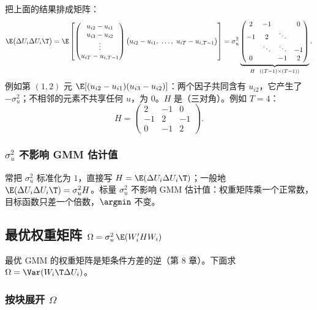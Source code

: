 把上面的结果排成矩阵：
\begin{equation}\label{eq:U12b-H}
\E\big(\Delta U_i\Delta U_i\T\big)
=\E\left[\begin{pmatrix}u_{i2}-u_{i1}\\ u_{i3}-u_{i2}\\ \vdots\\ u_{iT}-u_{i,T-1}\end{pmatrix}
\big(u_{i2}-u_{i1},\ \dots,\ u_{iT}-u_{i,T-1}\big)\right]
=\sigma_u^2\underbrace{\begin{pmatrix}2 & -1 & & 0\\ -1 & 2 & \ddots & \\ & \ddots & \ddots & -1\\ 0 & & -1 & 2\end{pmatrix}}_{H\ \ ((T-1)\times(T-1))}.
\end{equation}
例如第 $(1,2)$ 元 $\E[(u_{i2}-u_{i1})(u_{i3}-u_{i2})]$：两个因子共同含有 $u_{i2}$，它产生了 $-\sigma_u^2$；不相邻的元素不共享任何 $u$，为 $0$。$H$ 是（三对角）。例如 $T=4$：
\[
H=\begin{pmatrix}2 & -1 & 0\\ -1 & 2 & -1\\ 0 & -1 & 2\end{pmatrix}.
\]

\subsubsection{\texorpdfstring{$\sigma_u^2$}{sigma\_u\^{}2} 不影响 GMM 估计值}

常把 $\sigma_u^2$ 标准化为 $1$，直接写 $H=\E(\Delta U_i\Delta U_i\T)$；一般地 $\E(\Delta U_i\Delta U_i\T)=\sigma_u^2H$。标量 $\sigma_u^2$ 不影响 GMM 估计值：权重矩阵乘一个正常数，目标函数只差一个倍数，$\argmin$ 不变。

\subsection{最优权重矩阵 \texorpdfstring{$\Omega=\sigma_u^2\,\E(W_i'HW_i)$}{Omega = sigma\^{}2 E(W'HW)}}

最优 GMM 的权重矩阵是矩条件方差的逆（第 8 章）。下面求 $\Omega=\Var(W_i\T\Delta U_i)$。

\subsubsection{按块展开 \texorpdfstring{$\Omega$}{Omega}}

